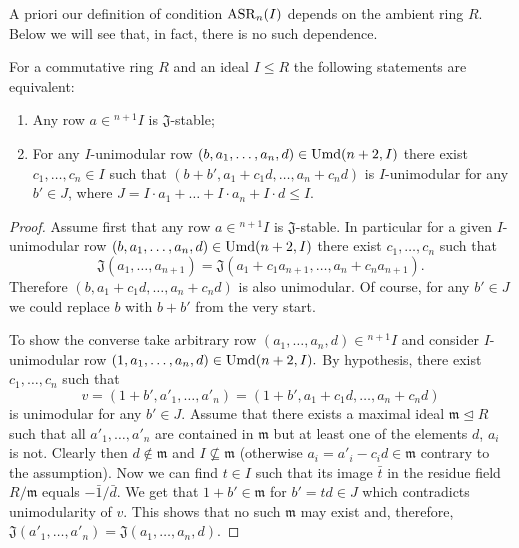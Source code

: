 A priori our definition of condition $\operatorname{ASR}_n(I)$ depends on the ambient ring $R$.
Below we will see that, in fact, there is no such dependence.
\begin{lemma}\label{lemma:relative-asr-unimod}
For a commutative ring $R$ and an ideal $I \leq R$ the following statements are equivalent:
\begin{enumerate} \item\label{asr-j-stable} Any row $a\in{}^{n+1}\!I$ is $\mathfrak{J}$-stable;
\item\label{asr-bak-like} For any $I$-unimodular row $(b,a_1,\ldots,a_n,d)\in\operatorname{Umd}(n+2,I)$ there exist $c_1,\ldots,c_n\in I$ 
 such that $(b+b',a_1+c_1d,\ldots,a_n+c_nd)$ is $I$-unimodular for any $b'\in J$, where $J=I \cdot a_1 + \ldots + I \cdot a_n + I \cdot d\leq I$.
\end{enumerate} 
\end{lemma}
\begin{proof}
Assume first that any row $a\in{}^{n+1}\!I$ is $\mathfrak{J}$-stable. 
In particular for a given $I$-unimodular row $(b,a_1,\ldots,a_n,d)\in\operatorname{Umd}(n+2,I)$ there exist $c_1,\ldots,c_n$ such that
\[\mathfrak{J}(a_1,\ldots,a_{n+1})=\mathfrak{J}(a_1+c_1a_{n+1},\ldots,a_n+c_na_{n+1}).\]
Therefore $(b,a_1+c_1d,\ldots,a_n+c_nd)$ is also unimodular. Of course, for any $b'\in J$ we could replace $b$ with $b+b'$ from the very start.

To show the converse take arbitrary row $(a_1,\ldots,a_n,d)\in{}^{n+1}\!I$ and consider $I$-unimodular row $(1,a_1,\ldots,a_n,d)\in\operatorname{Umd}(n+2,I).$
By hypothesis, there exist $c_1,\ldots,c_n$ such that \[ v=(1+b',a'_1,\ldots,a'_n)=(1+b',a_1+c_1d,\ldots,a_n+c_nd) \] is unimodular for any $b'\in J$.
Assume that there exists a maximal ideal $\mathfrak{m}\trianglelefteq R$ such that all $a'_1,\ldots,a'_n$ are contained in $\mathfrak{m}$
 but at least one of the elements $d$, $a_i$ is not.
Clearly then $d\notin\mathfrak{m}$ and $I\not\subseteq \mathfrak{m}$ (otherwise $a_i=a'_i-c_id\in\mathfrak{m}$ contrary to the assumption).
Now we can find $t\in I$ such that its image $\bar{t}$ in the residue field $R/\mathfrak{m}$ equals $-\bar{1}/\bar{d}$.
We get that $1 + b' \in \mathfrak{m}$ for $b'=td\in J$ which contradicts unimodularity of $v$.
This shows that no such $\mathfrak{m}$ may exist and, therefore, $\mathfrak{J}(a'_1,\ldots,a'_n)=\mathfrak{J}(a_1,\ldots,a_n,d)$.
\end{proof}

